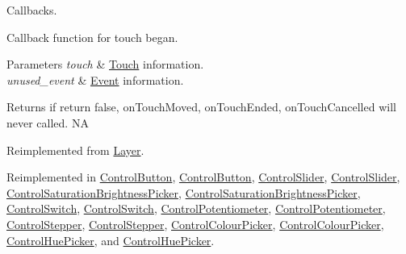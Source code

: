 Callbacks. 

Callback function for touch began.


\begin{DoxyParams}{Parameters}
{\em touch} & \hyperlink{classTouch}{Touch} information. \\
\hline
{\em unused\+\_\+event} & \hyperlink{classEvent}{Event} information. \\
\hline
\end{DoxyParams}
\begin{DoxyReturn}{Returns}
if return false, on\+Touch\+Moved, on\+Touch\+Ended, on\+Touch\+Cancelled will never called.  NA 
\end{DoxyReturn}


Reimplemented from \hyperlink{classLayer_abe632dc131bdeb3d603090d4d31db25c}{Layer}.



Reimplemented in \hyperlink{classControlButton_a170cc0df0207fba7bc352acc6173d948}{Control\+Button}, \hyperlink{classControlButton_a1f4736ab73edd357bf9caf9fa0e1dcd6}{Control\+Button}, \hyperlink{classControlSlider_a501e9da8ef3f1dacbfb9f7a12ecb2aed}{Control\+Slider}, \hyperlink{classControlSlider_a8f6fb619bb23b4e1507f1f2bb904f808}{Control\+Slider}, \hyperlink{classControlSaturationBrightnessPicker_a8660ed765c6c5c0d8856f59aa0ba34b2}{Control\+Saturation\+Brightness\+Picker}, \hyperlink{classControlSaturationBrightnessPicker_a4de153e53cccd78b56d9dc3e18411777}{Control\+Saturation\+Brightness\+Picker}, \hyperlink{classControlSwitch_aaba407c9125d0e4cc85fb5ae59ea964c}{Control\+Switch}, \hyperlink{classControlSwitch_a67af886fe24ec32313023514b28991f3}{Control\+Switch}, \hyperlink{classControlPotentiometer_a92d549b600c44bed4fd08d5ff13cbe8e}{Control\+Potentiometer}, \hyperlink{classControlPotentiometer_ae5ab22036e6a15b6a5d388db38f29bc7}{Control\+Potentiometer}, \hyperlink{classControlStepper_a7fbb969bb376da49033a5df63f562905}{Control\+Stepper}, \hyperlink{classControlStepper_a73a5572d0e9ba2a72da9f42884e621e7}{Control\+Stepper}, \hyperlink{classControlColourPicker_aec95ec2b1f58342568c73ecd208d6a12}{Control\+Colour\+Picker}, \hyperlink{classControlColourPicker_a83493e9deb3c69dd40be99009a4759d6}{Control\+Colour\+Picker}, \hyperlink{classControlHuePicker_af178753e94f91d15e613bf0c6387af5b}{Control\+Hue\+Picker}, and \hyperlink{classControlHuePicker_ae14f5994e10b93bec6b4de027902b2a1}{Control\+Hue\+Picker}.

\mbox{\label{classControl_a573efad6a6b492f4a6f4c5d06f0cdb88}} 
